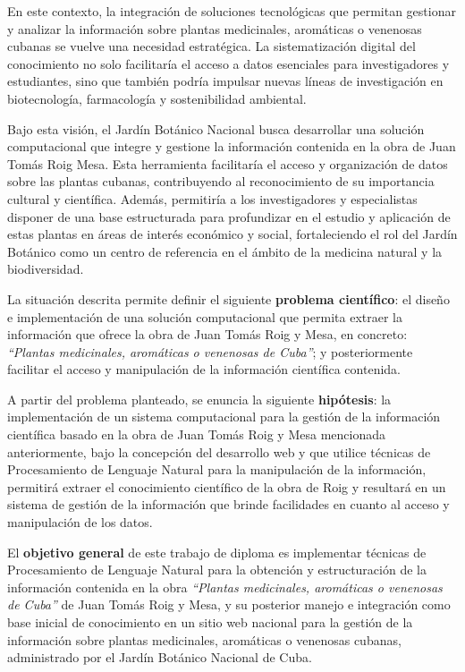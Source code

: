 En este contexto, la integración de soluciones tecnológicas que permitan gestionar y 
analizar la información sobre plantas medicinales, aromáticas o venenosas cubanas se vuelve una necesidad estratégica. 
La sistematización digital del conocimiento no solo facilitaría el acceso a datos esenciales 
para investigadores y estudiantes, sino que también podría impulsar nuevas líneas de 
investigación en biotecnología, farmacología y sostenibilidad ambiental.

Bajo esta visión, el Jardín Botánico Nacional busca desarrollar una solución computacional 
que integre y gestione la información contenida en la obra de Juan Tomás Roig Mesa. 
Esta herramienta facilitaría el acceso y organización de datos sobre las plantas 
cubanas, contribuyendo al reconocimiento de su importancia cultural y científica. 
Además, permitiría a los investigadores y especialistas disponer de una base estructurada 
para profundizar en el estudio y aplicación de estas plantas en áreas de interés 
económico y social, fortaleciendo el rol del Jardín Botánico como un centro 
de referencia en el ámbito de la medicina natural y la biodiversidad.

La situación descrita permite definir el siguiente \textbf{problema científico}: 
el diseño e implementación de una solución computacional que permita extraer 
la información que ofrece la obra de Juan Tomás Roig y Mesa, en concreto: 
\textit{``Plantas medicinales, aromáticas o venenosas de Cuba''}; y posteriormente 
facilitar el acceso y manipulación de la información científica contenida. 

A partir del problema planteado, se enuncia la siguiente \textbf{hipótesis}: 
la implementación de un sistema computacional para la gestión de la información 
científica basado en la obra de Juan Tomás Roig y Mesa mencionada anteriormente, 
bajo la concepción del desarrollo web y que utilice técnicas de Procesamiento de 
Lenguaje Natural para la manipulación de la información, permitirá extraer el 
conocimiento científico de la obra de Roig y resultará en un sistema de gestión de 
la información que brinde facilidades en cuanto al acceso y manipulación de los datos. 

El \textbf{objetivo general} de este trabajo de diploma es implementar técnicas 
de Procesamiento de Lenguaje Natural para la obtención y estructuración de la información 
contenida en la obra \textit{``Plantas medicinales, aromáticas o venenosas de Cuba''} de 
Juan Tomás Roig y Mesa, y su posterior manejo e integración como base inicial de conocimiento 
en un sitio web nacional para la gestión de la información sobre plantas medicinales, aromáticas o venenosas cubanas, 
administrado por el Jardín Botánico Nacional de Cuba.

